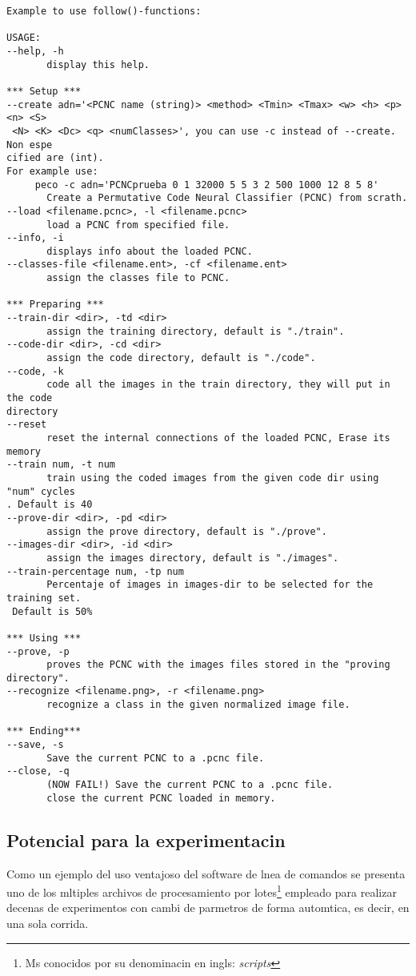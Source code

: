 \begin{verbatim}
Example to use follow()-functions:

USAGE:
--help, -h
       display this help.

*** Setup ***
--create adn='<PCNC name (string)> <method> <Tmin> <Tmax> <w> <h> <p> <n> <S>
 <N> <K> <Dc> <q> <numClasses>', you can use -c instead of --create. Non espe
cified are (int).
For example use: 
	 peco -c adn='PCNCprueba 0 1 32000 5 5 3 2 500 1000 12 8 5 8'  
       Create a Permutative Code Neural Classifier (PCNC) from scrath.
--load <filename.pcnc>, -l <filename.pcnc>
       load a PCNC from specified file.
--info, -i
       displays info about the loaded PCNC.
--classes-file <filename.ent>, -cf <filename.ent>
       assign the classes file to PCNC.

*** Preparing ***
--train-dir <dir>, -td <dir>
       assign the training directory, default is "./train".
--code-dir <dir>, -cd <dir>
       assign the code directory, default is "./code".
--code, -k
       code all the images in the train directory, they will put in the code 
directory
--reset
       reset the internal connections of the loaded PCNC, Erase its memory
--train num, -t num
       train using the coded images from the given code dir using "num" cycles
. Default is 40
--prove-dir <dir>, -pd <dir>
       assign the prove directory, default is "./prove".
--images-dir <dir>, -id <dir>
       assign the images directory, default is "./images".
--train-percentage num, -tp num
       Percentaje of images in images-dir to be selected for the training set.
 Default is 50%

*** Using ***
--prove, -p
       proves the PCNC with the images files stored in the "proving directory".
--recognize <filename.png>, -r <filename.png>
       recognize a class in the given normalized image file.

*** Ending***
--save, -s
       Save the current PCNC to a .pcnc file.
--close, -q
       (NOW FAIL!) Save the current PCNC to a .pcnc file.
       close the current PCNC loaded in memory.
\end{verbatim}

\subsection{Potencial para la experimentacin}
Como un ejemplo del uso ventajoso del software de lnea de comandos se presenta uno de los mltiples archivos de procesamiento por lotes\footnote{Ms conocidos por su denominacin en ingls: \emph{scripts}} empleado para realizar decenas de experimentos con cambi de parmetros de forma automtica, es decir, en una sola corrida.

